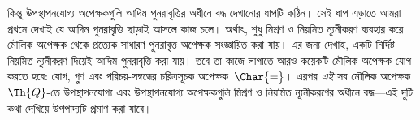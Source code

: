 \documentclass[../../../include/open-logic-section]{subfiles}
\begin{document}
কিন্তু উপস্থাপনযোগ্য অপেক্ষকগুলি আদিম পুনরাবৃত্তির অধীনে বদ্ধ দেখানোর ধাপটি
কঠিন। সেই ধাপ এড়াতে আমরা প্রথমে দেখাই যে আদিম পুনরাবৃত্তি ছাড়াই আসলে কাজ
চলে। অর্থাৎ, শুধু মিশ্রণ ও নিয়মিত ন্যূনীকরণ ব্যবহার করে মৌলিক অপেক্ষক থেকে
প্রত্যেক সাধারণ পুনরাবৃত্ত অপেক্ষক সংজ্ঞায়িত করা যায়। এর জন্য দেখাই, একটি
নির্দিষ্ট নিয়মিত ন্যূনীকরণ দিয়েই আদিম পুনরাবৃত্তি করা যায়। তবে তা কাজে
লাগাতে আরও কয়েকটি মৌলিক অপেক্ষক যোগ করতে হবে: যোগ, গুণ এবং পরিচয়-সম্বন্ধের
চরিত্রসূচক অপেক্ষক~$\Char{=}$। এরপর \emph{এই} সব মৌলিক অপেক্ষক $\Th{Q}$-তে
উপস্থাপনযোগ্য এবং উপস্থাপনযোগ্য অপেক্ষকগুলি মিশ্রণ ও নিয়মিত ন্যূনীকরণের
অধীনে বদ্ধ—এই দুটি কথা দেখিয়ে উপপাদ্যটি প্রমাণ করা যাবে।
\end{document}
